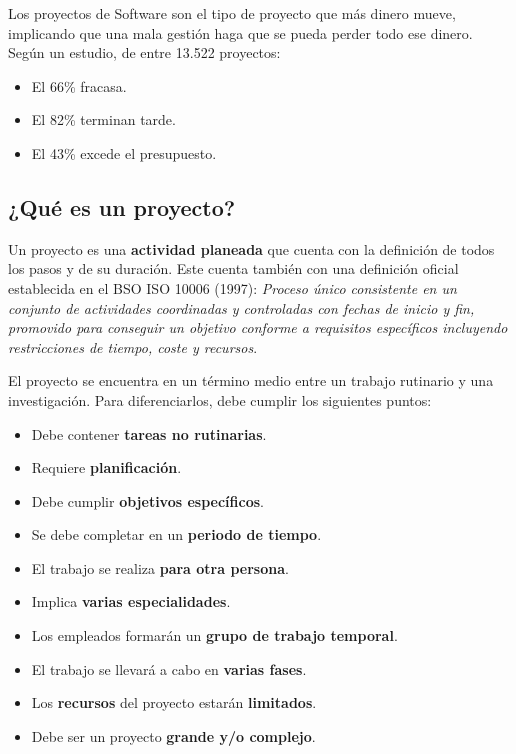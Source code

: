 \documentclass[12pt]{article}
\begin{document}
{Los proyectos de Software son el tipo de proyecto que más dinero mueve, implicando que una mala gestión haga que se pueda perder todo ese dinero. Según un estudio, de entre 13.522 proyectos:}

\begin{itemize}
    \item {El 66\% fracasa.}
    \item {El 82\% terminan tarde.}
    \item {El 43\% excede el presupuesto.}
\end{itemize}

\subsection{¿Qué es un proyecto?}
\label{1.3.0}

{Un proyecto es una \textbf{actividad planeada} que cuenta con la definición de todos los pasos y de su duración. Este cuenta también con una definición oficial establecida en el BSO ISO 10006 (1997): \textit{Proceso único consistente en un conjunto de actividades coordinadas y controladas con fechas de inicio y fin, promovido para conseguir un objetivo conforme a requisitos específicos incluyendo restricciones de tiempo, coste y recursos}.} \bigskip

{El proyecto se encuentra en un término medio entre un trabajo rutinario y una investigación. Para diferenciarlos, debe cumplir los siguientes puntos:}

\begin{itemize}
    \item {Debe contener \textbf{tareas no rutinarias}.}
    \item {Requiere \textbf{planificación}.}
    \item {Debe cumplir \textbf{objetivos específicos}.}
    \item {Se debe completar en un \textbf{periodo de tiempo}.}
    \item {El trabajo se realiza \textbf{para otra persona}.}
    \item {Implica \textbf{varias especialidades}.}
    \item {Los empleados formarán un \textbf{grupo de trabajo temporal}.}
    \item {El trabajo se llevará a cabo en \textbf{varias fases}.}
    \item {Los \textbf{recursos} del proyecto estarán \textbf{limitados}.}
    \item {Debe ser un proyecto \textbf{grande y/o complejo}.}
\end{itemize}
\end{document}
